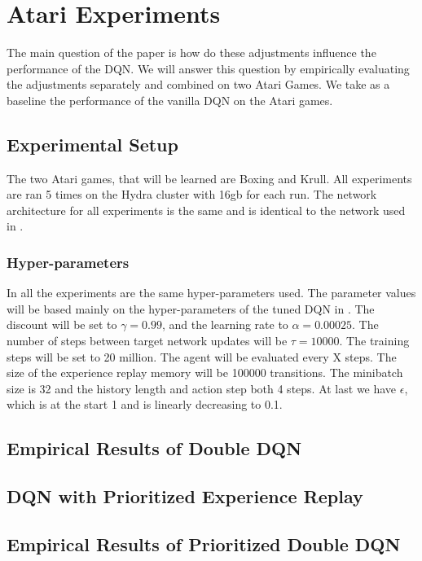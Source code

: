 \documentclass{sig-alternate}
\begin{document}
\section{Atari Experiments}

The main question of the paper is how do these adjustments influence the performance of the DQN. We will answer this question by empirically evaluating the adjustments separately and combined on two Atari Games. We take as a baseline the performance of the vanilla DQN on the Atari games.

\subsection{Experimental Setup}

The two Atari games, that will be learned are Boxing and Krull. All experiments are ran 5 times on the Hydra cluster with 16gb for each run. The network architecture for all experiments is the same and is identical to the network used in \cite{mnih2015human}. 

\subsubsection{Hyper-parameters}\label{Hyper parameters}

In all the experiments are the same hyper-parameters used. The parameter values will be based mainly on the hyper-parameters of the tuned DQN in \cite{mnih2015human}. The discount will be set to $\gamma=0.99$, and the learning rate to $\alpha=0.00025$. The number of steps between target network updates will be $\tau= 10000$. The training steps will be set to 20 million. The agent will be evaluated every X steps. The size of the experience replay memory will be 100000 transitions. The minibatch size is 32 and the history length and action step both 4 steps. At last we have $\epsilon$, which is at the start 1 and is linearly decreasing to 0.1.

\subsection{Empirical Results of Double DQN}


\subsection{DQN with Prioritized Experience Replay}

\subsection{Empirical Results of Prioritized Double DQN}
\end{document}
